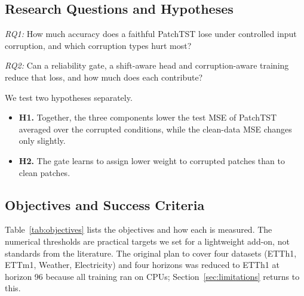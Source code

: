 \subsection{Research Questions and Hypotheses}

\textit{RQ1:} How much accuracy does a faithful PatchTST lose under controlled input corruption, and which corruption types hurt most?

\textit{RQ2:} Can a reliability gate, a shift-aware head and corruption-aware training reduce that loss, and how much does each contribute?

We test two hypotheses separately.
\begin{itemize}
\item \textbf{H1.} Together, the three components lower the test MSE of PatchTST averaged over the corrupted conditions, while the clean-data MSE changes only slightly.
\item \textbf{H2.} The gate learns to assign lower weight to corrupted patches than to clean patches.
\end{itemize}

\subsection{Objectives and Success Criteria}

Table~\ref{tab:objectives} lists the objectives and how each is measured. The numerical thresholds are practical targets we set for a lightweight add-on, not standards from the literature. The original plan to cover four datasets (ETTh1, ETTm1, Weather, Electricity) and four horizons was reduced to ETTh1 at horizon 96 because all training ran on CPUs; Section~\ref{sec:limitations} returns to this.

\begin{table}[!t]
\centering
\caption{Objectives and Success Criteria}
\label{tab:objectives}
\footnotesize
\renewcommand{\arraystretch}{1.15}
\end{table}
